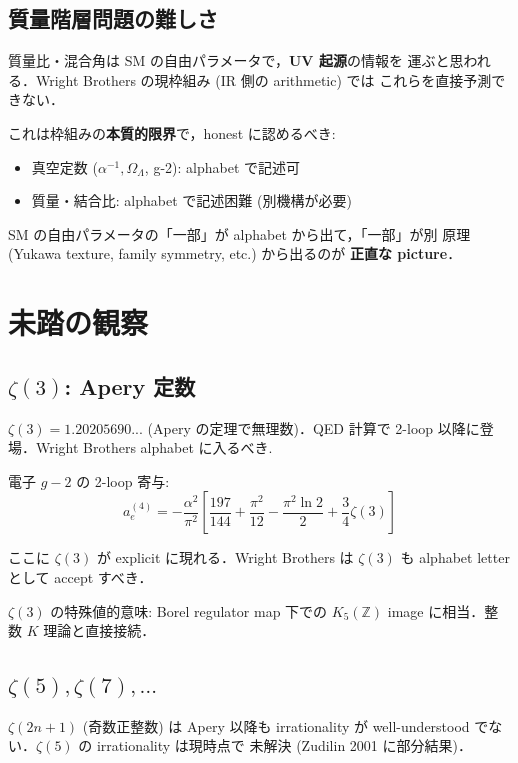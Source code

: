 \documentclass[11pt,a4paper]{article}
\begin{document}
\subsection{質量階層問題の難しさ}

質量比・混合角は SM の自由パラメータで，\textbf{UV 起源}の情報を
運ぶと思われる．Wright Brothers の現枠組み (IR 側の arithmetic) では
これらを直接予測できない．

これは枠組みの\textbf{本質的限界}で，honest に認めるべき:
\begin{itemize}
\item 真空定数 ($\alpha^{-1}, \Omega_\Lambda$, g-2): alphabet で記述可
\item 質量・結合比: alphabet で記述困難 (別機構が必要)
\end{itemize}

SM の自由パラメータの「一部」が alphabet から出て，「一部」が別
原理 (Yukawa texture, family symmetry, etc.) から出るのが
\textbf{正直な picture}．

\section{未踏の観察}

\subsection{$\zeta(3)$: Apery 定数}

$\zeta(3) = 1.20205690...$ (Apery の定理で無理数)．QED 計算で
2-loop 以降に登場．Wright Brothers alphabet に入るべき.

電子 $g-2$ の 2-loop 寄与:
\begin{equation}
a_e^{(4)} = -\frac{\alpha^2}{\pi^2}\left[\frac{197}{144} + \frac{\pi^2}{12} - \frac{\pi^2 \ln 2}{2} + \frac{3}{4}\zeta(3)\right]
\end{equation}

ここに $\zeta(3)$ が explicit に現れる．Wright Brothers は $\zeta(3)$ も
alphabet letter として accept すべき．

$\zeta(3)$ の特殊値的意味: Borel regulator map 下での $K_5(\mathbb{Z})$
image に相当．整数 $K$ 理論と直接接続．

\subsection{$\zeta(5), \zeta(7), \ldots$}

$\zeta(2n+1)$ (奇数正整数) は Apery 以降も irrationality が
well-understood でない．$\zeta(5)$ の irrationality は現時点で
未解決 (Zudilin 2001 に部分結果)．
\end{document}
